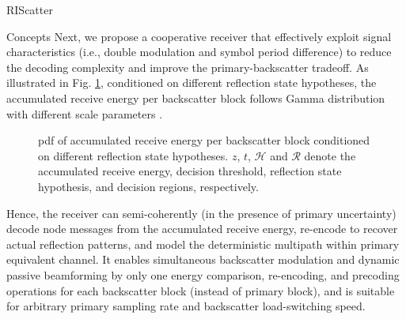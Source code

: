 \documentclass[journal]{IEEEtran}
\begin{document}
\begin{section}{RIScatter}
\begin{subsection}{Concepts}
		Next, we propose a cooperative receiver that effectively exploit signal characteristics (i.e., double modulation and symbol period difference) to reduce the decoding complexity and improve the primary-backscatter tradeoff.
		As illustrated in Fig. \ref{fg:energy_distribution}, conditioned on different reflection state hypotheses, the accumulated receive energy per backscatter block follows Gamma distribution with different scale parameters \cite{Qian2017b}.
		\begin{figure}[!t]
			\centering
			\resizebox{0.8\columnwidth}{!}{
				
			}
			\caption{
				\gls{pdf} of accumulated receive energy per backscatter block conditioned on different reflection state hypotheses.
				$z$, $t$, $\mathcal{H}$ and $\mathcal{R}$ denote the accumulated receive energy, decision threshold, reflection state hypothesis, and decision regions, respectively.
			}
			\label{fg:energy_distribution}
		\end{figure}
		Hence, the receiver can semi-coherently (in the presence of primary uncertainty) decode node messages from the accumulated receive energy, re-encode to recover actual reflection patterns, and model the deterministic multipath within primary equivalent channel.
		It enables simultaneous backscatter modulation and dynamic passive beamforming by only one energy comparison, re-encoding, and precoding operations for each backscatter block (instead of primary block), and is suitable for arbitrary primary sampling rate and backscatter load-switching speed.
	\end{subsection}



\end{section}
\end{document}
